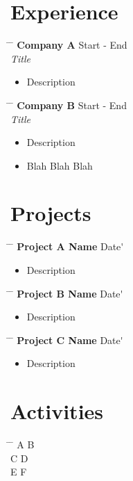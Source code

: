 \documentclass[a4paper,10pt]{article}
\newcommand{\leftindent}{.25in}
\newcommand{\middleindent}{3in}
\newcommand{\rightindent}{6.75in}
\newcommand{\listindent}{.6in}
\newcommand{\sectionseparation}{-.05in}
\newcommand{\showexperience} {
\begin{tabbing}
\hspace{\leftindent} \= \hspace{\rightindent} \= \kill %
\>\textbf{\experienceplace} \> \experiencedate \' \\
\>\textit{\experiencetitle}
\end{tabbing}
\vspace{\sectionseparation}	
\begin{itemize} [leftmargin=\listindent]
\experienceitems
\end{itemize}
} %
\newcommand{\showproject} {
\begin{tabbing}
\hspace{\leftindent} \= \hspace{\rightindent} \= \kill %
\>\textbf{\projectname} \> \projectdate \'
\end{tabbing}
\vspace{\sectionseparation}	
\begin{itemize} [leftmargin=\listindent]
\projectitems
\end{itemize}
} %
\begin{document}
\section{Experience}

\newcommand{\experienceplace}{Company A}
\newcommand{\experiencedate}{Start - End}
\newcommand{\experiencetitle}{Title}
\newcommand{\experienceitems} {
\item Description
}
\showexperience 

\renewcommand{\experienceplace}{Company B}
\renewcommand{\experiencedate}{Start - End}
\renewcommand{\experiencetitle}{Title}
\renewcommand{\experienceitems} {
\item Description
\item Blah Blah Blah
}
\showexperience 

\vspace{\sectionseparation}
\section{Projects} 

\newcommand{\projectname}{Project A Name}
\newcommand{\projectdate}{Date}
\newcommand{\projectitems}{
\item Description
}
\showproject

\renewcommand{\projectname}{Project B Name}
\renewcommand{\projectdate}{Date}
\renewcommand{\projectitems}{
 \item Description
}
\showproject

\renewcommand{\projectname}{Project C Name}
\renewcommand{\projectdate}{Date}
\renewcommand{\projectitems}{
\item Description
}
\showproject

\vspace{\sectionseparation}
\section{Activities}
\begin{tabbing}
\hspace{\leftindent} \= \hspace{\middleindent} \= \kill %
\>A \> B \\
\>C \> D \\
\>E \> F \\
\end{tabbing}
\end{document}

